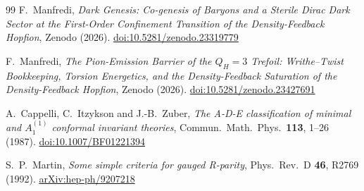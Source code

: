 \documentclass[11pt,a4paper]{article}
\theoremstyle{definition}\newtheorem{definition}[theorem]{Definition}
\theoremstyle{remark}
\begin{document}
\begin{thebibliography}{99}
F.~Manfredi,
\textit{Dark Genesis: Co-genesis of Baryons and a Sterile Dirac Dark Sector
at the First-Order Confinement Transition of the Density-Feedback Hopfion},
Zenodo (2026).
\href{https://doi.org/10.5281/zenodo.23319779}{doi:10.5281/zenodo.23319779}

F.~Manfredi,
\textit{The Pion-Emission Barrier of the $Q_H=3$ Trefoil: Writhe--Twist Bookkeeping,
Torsion Energetics, and the Density-Feedback Saturation of the Density-Feedback Hopfion},
Zenodo (2026).
\href{https://doi.org/10.5281/zenodo.23427691}{doi:10.5281/zenodo.23427691}

A.~Cappelli, C.~Itzykson and J.-B.~Zuber,
\textit{The A-D-E classification of minimal and $A_1^{(1)}$ conformal
  invariant theories},
Commun.\ Math.\ Phys.\ \textbf{113}, 1--26 (1987).
\href{https://doi.org/10.1007/BF01221394}{doi:10.1007/BF01221394}

S.~P.~Martin,
\textit{Some simple criteria for gauged R-parity},
Phys.\ Rev.\ D \textbf{46}, R2769 (1992).
\href{https://arxiv.org/abs/hep-ph/9207218}{arXiv:hep-ph/9207218}

\end{thebibliography}
\end{document}
